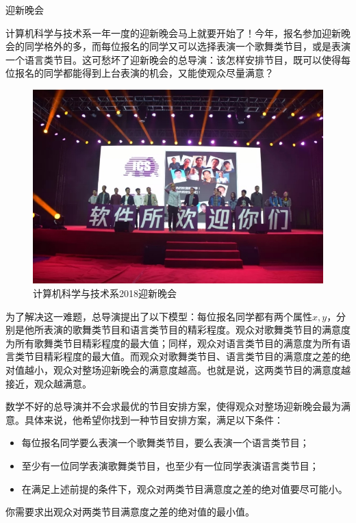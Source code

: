 \begin{Problem}{迎新晚会}{}

计算机科学与技术系一年一度的迎新晚会马上就要开始了！今年，报名参加迎新晚会的同学格外的多，而每位报名的同学又可以选择表演一个歌舞类节目，或是表演一个语言类节目。这可愁坏了迎新晚会的总导演：该怎样安排节目，既可以使得每位报名的同学都能得到上台表演的机会，又能使观众尽量满意？

\begin{figure}[h]
\center
\includegraphics[width=12cm]{src/party/party.jpg}
\caption{计算机科学与技术系2018迎新晚会}
\end{figure}

为了解决这一难题，总导演提出了以下模型：每位报名同学都有两个属性$x, y$，分别是他所表演的歌舞类节目和语言类节目的精彩程度。观众对歌舞类节目的满意度为所有歌舞类节目精彩程度的最大值；同样，观众对语言类节目的满意度为所有语言类节目精彩程度的最大值。而观众对歌舞类节目、语言类节目的满意度之差的绝对值越小，观众对整场迎新晚会的满意度越高。也就是说，这两类节目的满意度越接近，观众越满意。

数学不好的总导演并不会求最优的节目安排方案，使得观众对整场迎新晚会最为满意。具体来说，他希望你找到一种节目安排方案，满足以下条件：

\begin{itemize}
\item 每位报名同学要么表演一个歌舞类节目，要么表演一个语言类节目；
\item 至少有一位同学表演歌舞类节目，也至少有一位同学表演语言类节目；
\item 在满足上述前提的条件下，观众对两类节目满意度之差的绝对值要尽可能小。
\end{itemize}

你需要求出观众对两类节目满意度之差的绝对值的最小值。


\end{Problem}
